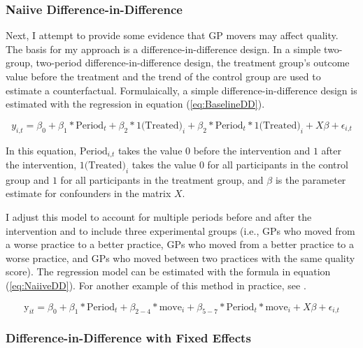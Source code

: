 \documentclass[11pt]{article}
\newcommand{\mc}{\textrm{,}}
\begin{document}
\subsubsection{Naiive Difference-in-Difference}

Next, I attempt to provide some evidence that GP movers may affect quality. The basis for my approach is a difference-in-difference design. In a simple two-group, two-period difference-in-difference design, the treatment group's outcome value before the treatment and the trend of the control group are used to estimate a counterfactual. Formulaically, a simple difference-in-difference design is estimated with the regression in equation (\ref{eq:BaselineDD}).

\begin{equation} \label{eq:BaselineDD}
  y_{i \mc t} = \beta_0 + \beta_1*\textrm{Period}_{t} + \beta_2*\textrm{1(Treated)}_{i} + \beta_2*\textrm{Period}_{ t}*\textrm{1(Treated)}_{i} + X \beta + \epsilon_{i \mc t}
\end{equation}

In this equation, $\textrm{Period}_{i \mc t}$ takes the value $0$ before the intervention and $1$ after the intervention, $\textrm{1(Treated)}_{i}$ takes the value $0$ for all participants in the control group and $1$ for all participants in the treatment group, and $\beta$ is the parameter estimate for confounders in the matrix $X$.

I adjust this model to account for multiple periods before and after the intervention and to include three experimental groups (i.e., GPs who moved from a worse practice to a better practice, GPs who moved from a better practice to a worse practice, and GPs who moved between two practices with the same quality score). The regression model can be estimated with the formula in equation (\ref{eq:NaiiveDD}). For another example of this method in practice, see \citep{erlanggaImpactPublicHealth2019}.

\begin{equation} \label{eq:NaiiveDD}
  \textrm{y}_{it} = \beta_0 + \beta_1*\textrm{Period}_{t} + \beta_{2-4}*\textrm{move}_{i} + \beta_{5-7}*\textrm{Period}_{ t}*\textrm{move}_{i} + X \beta + \epsilon_{i \mc t}
\end{equation}



\subsubsection{Difference-in-Difference with Fixed Effects}
\end{document}
